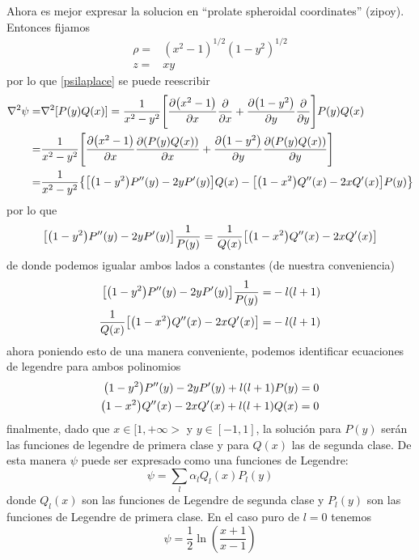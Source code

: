 \documentclass[../Main.tex]{subfiles}
\begin{document}
%
Ahora es mejor expresar la solucion en ``prolate spheroidal coordinates'' (zipoy). Entonces fijamos
%
\begin{eqnarray}
    \rho= & (x^2-1)^{1/2}(1-y^{2})^{1/2} \\
    z = & xy
\end{eqnarray}
%
por lo que \eqref{psilaplace} se puede reescribir
%
\begin{eqnarray*}
    \laplacian{\psi}= & \laplacian[P(y)Q(x)]= \dfrac{1}{x^{2}-y^{2}}\qty[\pdv{\qty(x^{2}-1)}{x}\pdv{x}+\pdv{\qty(1-y^{2})}{y}\pdv{y}]P(y)Q(x) \\
    = & \dfrac{1}{x^{2}-y^{2}}\qty[\pdv{\qty(x^{2}-1)}{x}\pdv{\qty(P(y)Q(x))}{x}+\pdv{\qty(1-y^{2})}{y}\pdv{\qty(P(y)Q(x))}{y}] \\
    = & \dfrac{1}{x^{2}-y^{2}}\qty{\qty[\qty(1-y^{2})P''(y)-2yP'(y)]Q(x)-\qty[\qty(1-x^{2})Q''(x)-2xQ'(x)]P(y)}
\end{eqnarray*}
%
por lo que
%
\begin{equation}
    \qty[\qty(1-y^{2})P''(y)-2yP'(y)]\dfrac{1}{P(y)}=\dfrac{1}{Q(x)}\qty[\qty(1-x^{2})Q''(x)-2xQ'(x)]
\end{equation}
%
de donde podemos igualar ambos lados a constantes (de nuestra conveniencia)
%
\begin{eqnarray*}
    \qty[\qty(1-y^{2})P''(y)-2yP'(y)]\dfrac{1}{P(y)} = & -l\qty(l+1) \\
    \dfrac{1}{Q(x)}\qty[\qty(1-x^{2})Q''(x)-2xQ'(x)] = & -l\qty(l+1)
\end{eqnarray*}
%
ahora poniendo esto de una manera conveniente, podemos identificar ecuaciones de legendre para ambos polinomios
%
\begin{eqnarray*}
    \qty(1-y^{2})P''(y)-2yP'(y)+l\qty(l+1)P(y)=0 \\
    \qty(1-x^{2})Q''(x)-2xQ'(x)+l\qty(l+1)Q(x)=0
\end{eqnarray*}
%
finalmente, dado que $x\in [1,+\infty>$ y $y \in [-1,1]$, la solución para $P(y)$ serán las funciones de legendre de primera clase y para $Q(x)$ las de segunda clase. De esta manera $\psi$ puede ser expresado como una funciones de Legendre:
%
\begin{equation}
    \psi=\sum_{l}\alpha_{l}Q_{l}(x)P_{l}(y)
\end{equation}
%
donde $Q_{l}(x)$ son las funciones de Legendre de segunda clase y $P_{l}(y)$ son las funciones de Legendre de primera clase. En el caso puro de $l=0$ tenemos
%
\begin{equation}
    \psi=\frac{1}{2}\ln(\dfrac{x+1}{x-1})
\end{equation}
\end{document}

